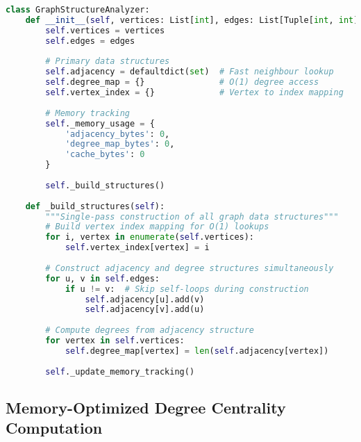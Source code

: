\begin{lstlisting}[language=Python, caption=Efficient Graph Structure Construction]
class GraphStructureAnalyzer:
    def __init__(self, vertices: List[int], edges: List[Tuple[int, int]]):
        self.vertices = vertices
        self.edges = edges
        
        # Primary data structures
        self.adjacency = defaultdict(set)  # Fast neighbour lookup
        self.degree_map = {}               # O(1) degree access
        self.vertex_index = {}             # Vertex to index mapping
        
        # Memory tracking
        self._memory_usage = {
            'adjacency_bytes': 0,
            'degree_map_bytes': 0,
            'cache_bytes': 0
        }
        
        self._build_structures()
    
    def _build_structures(self):
        """Single-pass construction of all graph data structures"""
        # Build vertex index mapping for O(1) lookups
        for i, vertex in enumerate(self.vertices):
            self.vertex_index[vertex] = i
        
        # Construct adjacency and degree structures simultaneously
        for u, v in self.edges:
            if u != v:  # Skip self-loops during construction
                self.adjacency[u].add(v)
                self.adjacency[v].add(u)
        
        # Compute degrees from adjacency structure
        for vertex in self.vertices:
            self.degree_map[vertex] = len(self.adjacency[vertex])
        
        self._update_memory_tracking()
\end{lstlisting}

\subsection{Memory-Optimized Degree Centrality Computation}
\label{appendix:degree-centrality}

